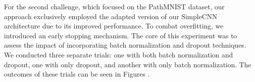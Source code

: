 For the second challenge, which focused on the PathMNIST dataset, our approach exclusively employed the adapted version of our SimpleCNN architecture due to its improved performance. To combat overfitting, we introduced an early stopping mechanism. The core of this experiment was to assess the impact of incorporating batch normalization and dropout techniques. We conducted three separate trials: one with both batch normalization and dropout, one with only dropout, and another with only batch normalization. The outcomes of these trials can be seen in Figures .